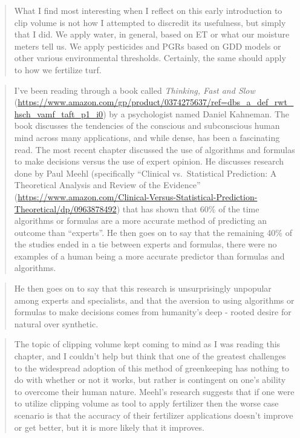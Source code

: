 \documentclass[12pt,b5,]{tufte-book}
\begin{document}
\begin{quote}
What I find most interesting when I reflect on this early introduction to clip volume is not how I attempted to discredit its usefulness, but simply that I did. We apply water, in general, based on ET or what our moisture meters tell us. We apply pesticides and PGRs based on GDD models or other various environmental thresholds. Certainly, the same should apply to how we fertilize turf.
\end{quote}

\begin{quote}
I've been reading through a book called \emph{Thinking, Fast and Slow} (\url{https://www.amazon.com/gp/product/0374275637/ref=dbs_a_def_rwt_hsch_vamf_taft_p1_i0}) by a psychologist named Daniel Kahneman. The book discusses the tendencies of the conscious and subconscious human mind across many applications, and while dense, has been a fascinating read. The most recent chapter discussed the use of algorithms and formulas to make decisions versus the use of expert opinion. He discusses research done by Paul Meehl (specifically ``Clinical vs.~Statistical Prediction: A Theoretical Analysis and Review of the Evidence'' (\url{https://www.amazon.com/Clinical-Versus-Statistical-Prediction-Theoretical/dp/0963878492}) that has shown that 60\% of the time algorithms or formulas are a more accurate method of predicting an outcome than ``experts''. He then goes on to say that the remaining 40\% of the studies ended in a tie between experts and formulas, there were no examples of a human being a more accurate predictor than formulas and algorithms.
\end{quote}

\begin{quote}
He then goes on to say that this research is unsurprisingly unpopular among experts and specialists, and that the aversion to using algorithms or formulas to make decisions comes from humanity's deep - rooted desire for natural over synthetic.
\end{quote}

\begin{quote}
The topic of clipping volume kept coming to mind as I was reading this chapter, and I couldn't help but think that one of the greatest challenges to the widespread adoption of this method of greenkeeping has nothing to do with whether or not it works, but rather is contingent on one's ability to overcome their human nature. Meehl's research suggests that if one were to utilize clipping volume as tool to apply fertilizer then the worse case scenario is that the accuracy of their fertilizer applications doesn't improve or get better, but it is more likely that it improves.
\end{quote}
\end{document}
